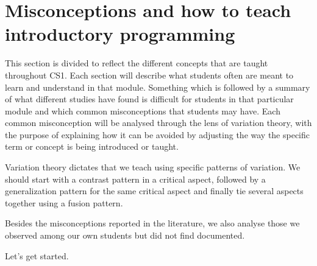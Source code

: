 \mode*
\section[Misconceptions and teaching]
  {Misconceptions and how to teach introductory programming}
\label{misconceptions}

This section is divided to reflect the different concepts that are taught 
throughout CS1. Each section will describe what students often are meant to 
learn and understand in that module. Something which is followed by a 
summary 
of what different studies have found is difficult for students in that 
particular
module and which common misconceptions that students may have. Each common 
misconception will be analysed through the lens of variation theory, with 
the purpose of explaining how it can be avoided by adjusting the way 
the specific term or concept is being introduced or taught.

Variation theory dictates that we teach using specific patterns of variation.
We should start with a contrast pattern in a critical aspect, followed by a 
generalization pattern for the same critical aspect and finally tie several 
aspects together using a fusion pattern.

Besides the misconceptions reported in the literature, we also analyse those we
observed among our own students but did not find documented.

Let's get started.

